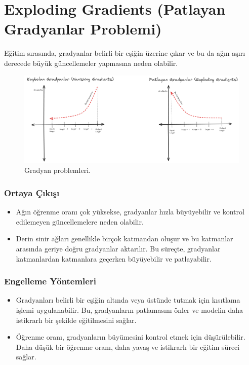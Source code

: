 \section{Exploding Gradients (Patlayan Gradyanlar Problemi)}
Eğitim sırasında, gradyanlar belirli bir eşiğin üzerine çıkar ve bu da ağın aşırı derecede büyük güncellemeler yapmasına neden olabilir. 

\begin{figure}[h]
    \centering
    \includegraphics[width=1\textwidth]{images/gradient_problems.png}
    \caption{Gradyan problemleri.}
    \label{fig:enter-label}
\end{figure}

\subsubsection{Ortaya Çıkışı}
\begin{itemize}
    \item Ağın öğrenme oranı çok yüksekse, gradyanlar hızla büyüyebilir ve kontrol edilemeyen güncellemelere neden olabilir.
    \item Derin sinir ağları genellikle birçok katmandan oluşur ve bu katmanlar arasında geriye doğru gradyanlar aktarılır. Bu süreçte, gradyanlar katmanlardan katmanlara geçerken büyüyebilir ve patlayabilir.
\end{itemize}

\subsubsection{Engelleme Yöntemleri}
\begin{itemize}
    \item Gradyanları belirli bir eşiğin altında veya üstünde tutmak için kısıtlama işlemi uygulanabilir. Bu, gradyanların patlamasını önler ve modelin daha istikrarlı bir şekilde eğitilmesini sağlar.
    \item Öğrenme oranı, gradyanların büyümesini kontrol etmek için düşürülebilir. Daha düşük bir öğrenme oranı, daha yavaş ve istikrarlı bir eğitim süreci sağlar.
\end{itemize}

\newpage